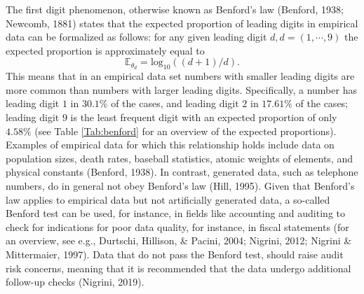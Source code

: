 \documentclass[
  english,
  man,floatsintext]{apa6}
\begin{document}
The first digit phenomenon, otherwise known as Benford's law (Benford, 1938; Newcomb, 1881) states that the expected proportion of leading digits in empirical data can be formalized as follows: for any given leading digit \(d, d = (1, \cdots, 9)\) the expected proportion is approximately equal to \[\mathbb{E}_{\theta_d}= \text{log}_{10}((d + 1)/d).\] This means that in an empirical data set numbers with smaller leading digits are more common than numbers with larger leading digits. Specifically, a number has leading digit \(1\) in \(30.1 \%\) of the cases, and leading digit \(2\) in \(17.61 \%\) of the cases; leading digit \(9\) is the least frequent digit with an expected proportion of only \(4.58 \%\) (see Table \ref{Tab:benford} for an overview of the expected proportions). Examples of empirical data for which this relationship holds include data on population sizes, death rates, baseball statistics, atomic weights of elements, and physical constants (Benford, 1938). In contrast, generated data, such as telephone numbers, do in general not obey Benford's law (Hill, 1995). Given that Benford's law applies to empirical data but not artificially generated data, a so-called Benford test can be used, for instance, in fields like accounting and auditing to check for indications for poor data quality, for instance, in fiscal statements (for an overview, see e.g., Durtschi, Hillison, \& Pacini, 2004; Nigrini, 2012; Nigrini \& Mittermaier, 1997). Data that do not pass the Benford test, should raise audit risk concerns, meaning that it is recommended that the data undergo additional follow-up checks (Nigrini, 2019).
\end{document}

